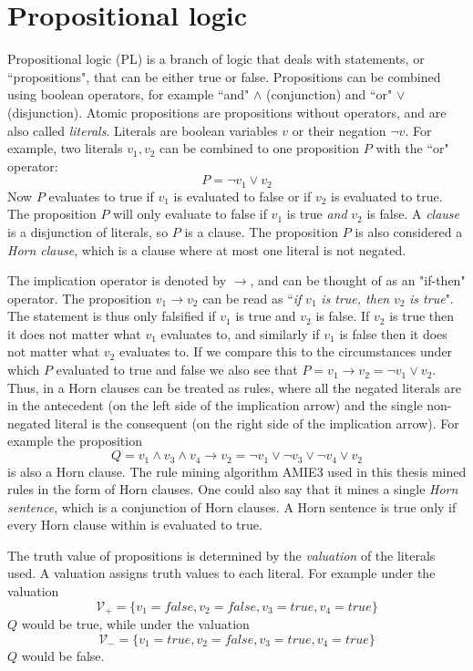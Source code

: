 \section{Propositional logic}
\label{propositional_logic}
Propositional logic (PL) is a branch of logic that deals with statements, or ``propositions", that can be either true or false. Propositions can be combined using boolean operators, for example ``and" $\wedge$ (conjunction) and ``or" $\vee$ (disjunction). Atomic propositions are propositions without operators, and are also called \textit{literals}. Literals are boolean variables $v$ or their negation $\neg v$. For example, two literals $v_1, v_2$ can be combined to one proposition $P$ with the ``or" operator:
\[P = \neg v_1 \vee v_2\]
Now $P$ evaluates to true if $v_1$ is evaluated to false or if $v_2$ is evaluated to true. The proposition $P$ will only evaluate to false if $v_1$ is true \textit{and} $v_2$ is false. A \textit{clause} is a disjunction of literals, so $P$ is a clause. The proposition $P$ is also considered a \textit{Horn clause}, which is a clause where at most one literal is not negated. 

The implication operator is denoted by $\rightarrow$, and can be thought of as an "if-then" operator. The proposition $v_1 \rightarrow v_2$ can be read as ``\textit{if} $v_1$\textit{ is true, then }$v_2$ \textit{is true}". The statement is thus only falsified if $v_1$ is true and $v_2$ is false. If $v_2$ is true then it does not matter what $v_1$ evaluates to, and similarly if $v_1$ is false then it does not matter what $v_2$ evaluates to. If we compare this to the circumstances under which $P$ evaluated to true and false we also see that $P = v_1 \rightarrow v_2 = \neg v_1 \vee v_2$. 
Thus, in a Horn clauses can be treated as rules, where all the negated literals are in the antecedent (on the left side of the implication arrow) and the single non-negated literal is the consequent (on the right side of the implication arrow). For example the proposition \[Q = v_1 \wedge v_3 \wedge v_4\rightarrow v_2 = \neg v_1 \vee \neg v_3 \vee \neg v_4\vee v_2\] is also a Horn clause. The rule mining algorithm AMIE3 used in this thesis mined rules in the form of Horn clauses. One could also say that it mines a single \textit{Horn sentence}, which is a conjunction of Horn clauses. A Horn sentence is true only if every Horn clause within is evaluated to true.

The truth value of propositions is determined by the \textit{valuation} of the literals used. A valuation assigns truth values to each literal. For example under the valuation \[\mathcal{V_{+}}=\{v_1 = false, v_2 = false, v_3 = true, v_4 = true\}\] $Q$ would be true, while under the valuation \[\mathcal{V_{-}}=\{v_1 = true, v_2 = false, v_3 = true, v_4 = true\}\] $Q$ would be false.